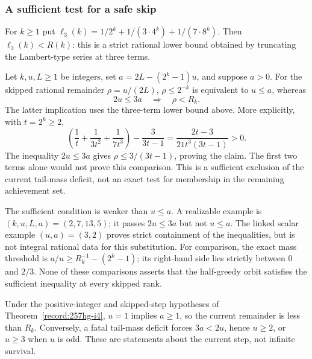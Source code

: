 \subsubsection*{A sufficient test for a safe skip}

\begin{defn}\label{record:257hg-i3}
For $k\ge1$ put $\ell_3(k)=1/2^k + 1/(3\cdot4^k) + 1/(7\cdot8^k)$.  Then
$\ell_3(k)<\ensuremath{R}(k)$: this is a strict rational lower bound obtained by truncating
the Lambert-type series at three terms.
\par\noindent   {}  
\end{defn}

\begin{thm}\label{record:257hg-i4}
Let $k,u,L\ge1$ be integers, set $a=2L-(2^k-1)u$, and
suppose $a>0$.  For the skipped rational remainder $\rho=u/(2L)$,
$\rho\le2^{-k}$ is equivalent to $u\le a$, whereas
\[
 2u\le3a\quad\Longrightarrow\quad\rho<R_k.
\]
The latter implication uses the three-term lower bound above.  More
explicitly, with $t=2^k\ge2$,
\[
 \left(\frac1t+\frac1{3t^2}+\frac1{7t^3}\right)
       -\frac3{3t-1}
 =\frac{2t-3}{21t^3(3t-1)}>0.
\]
The inequality $2u\le3a$ gives $\rho\le3/(3t-1)$, proving the
claim.  The first two terms alone would not prove this comparison.
This is a sufficient exclusion of the current tail-mass deficit, not
an exact test for membership in the remaining achievement set.

The sufficient condition is weaker than $u\le a$.  A realizable example
is $(k,u,L,a)=(2,7,13,5)$; it passes $2u\le3a$ but not $u\le a$.
The linked scalar example $(u,a)=(3,2)$ proves strict containment of the
inequalities, but is not integral rational data for this substitution.
For comparison, the exact mass threshold is
$a/u\ge R_k^{-1}-(2^k-1)$; its right-hand side lies strictly between
$0$ and $2/3$.  None of these comparisons asserts that the half-greedy
orbit satisfies the sufficient inequality at every skipped rank.
\end{thm}

\begin{prop}\label{record:257hg-i5}
Under the positive-integer and skipped-step hypotheses of
Theorem~\ref{record:257hg-i4}, $u=1$ implies $a\ge1$, so the current
remainder is less than $R_k$.  Conversely, a fatal tail-mass deficit
forces $3a<2u$, hence $u\ge2$, or $u\ge3$ when $u$ is odd.
These are statements about the current step, not infinite survival.
\end{prop}

